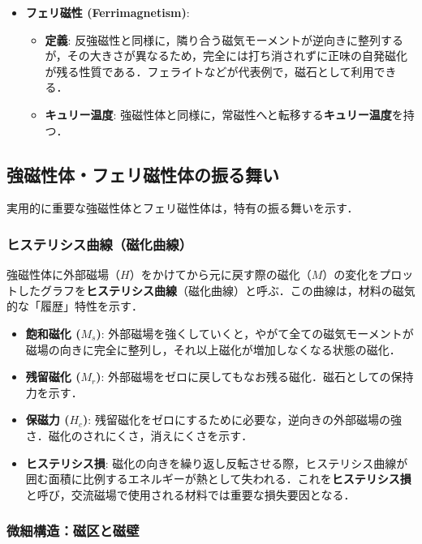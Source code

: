 \documentclass[11pt,a4paper]{ltjsarticle}
\newcommand{\supcite}[1]{\textsuperscript{\cite{#1}}}
\begin{document}
\begin{itemize}
\item \textbf{フェリ磁性 (Ferrimagnetism)}:
  \begin{itemize}
  \item \textbf{定義}: 反強磁性と同様に，隣り合う磁気モーメントが逆向きに整列するが，その大きさが異なるため，完全には打ち消されずに正味の自発磁化が残る性質である．フェライトなどが代表例で，磁石として利用できる\supcite{ref1}．
  \item \textbf{キュリー温度}: 強磁性体と同様に，常磁性へと転移する\textbf{キュリー温度}を持つ\supcite{ref1}．
  \end{itemize}
\end{itemize}

\subsection{強磁性体・フェリ磁性体の振る舞い}

実用的に重要な強磁性体とフェリ磁性体は，特有の振る舞いを示す．

\subsubsection{ヒステリシス曲線（磁化曲線）}

強磁性体に外部磁場（$H$）をかけてから元に戻す際の磁化（$M$）の変化をプロットしたグラフを\textbf{ヒステリシス曲線}（磁化曲線）と呼ぶ．この曲線は，材料の磁気的な「履歴」特性を示す\supcite{ref1}．

\begin{itemize}
\item \textbf{飽和磁化 ($M_s$)}: 外部磁場を強くしていくと，やがて全ての磁気モーメントが磁場の向きに完全に整列し，それ以上磁化が増加しなくなる状態の磁化\supcite{ref1}．
\item \textbf{残留磁化 ($M_r$)}: 外部磁場をゼロに戻してもなお残る磁化．磁石としての保持力を示す\supcite{ref1}．
\item \textbf{保磁力 ($H_c$)}: 残留磁化をゼロにするために必要な，逆向きの外部磁場の強さ．磁化のされにくさ，消えにくさを示す\supcite{ref1}．
\item \textbf{ヒステリシス損}: 磁化の向きを繰り返し反転させる際，ヒステリシス曲線が囲む面積に比例するエネルギーが熱として失われる．これを\textbf{ヒステリシス損}と呼び，交流磁場で使用される材料では重要な損失要因となる\supcite{ref1}．
\end{itemize}

\subsubsection{微細構造：磁区と磁壁}
\end{document}
